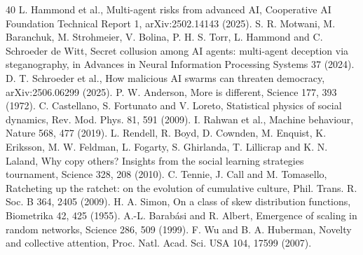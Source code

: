 \documentclass[twocolumn,10pt]{article}
\begin{document}
\begin{thebibliography}{40}
 L. Hammond et al., Multi-agent risks from advanced AI, Cooperative AI Foundation Technical Report 1, arXiv:2502.14143 (2025).
 S. R. Motwani, M. Baranchuk, M. Strohmeier, V. Bolina, P. H. S. Torr, L. Hammond and C. Schroeder de Witt, Secret collusion among AI agents: multi-agent deception via steganography, in Advances in Neural Information Processing Systems 37 (2024).
 D. T. Schroeder et al., How malicious AI swarms can threaten democracy, arXiv:2506.06299 (2025).
 P. W. Anderson, More is different, Science 177, 393 (1972).
 C. Castellano, S. Fortunato and V. Loreto, Statistical physics of social dynamics, Rev. Mod. Phys. 81, 591 (2009).
 I. Rahwan et al., Machine behaviour, Nature 568, 477 (2019).
 L. Rendell, R. Boyd, D. Cownden, M. Enquist, K. Eriksson, M. W. Feldman, L. Fogarty, S. Ghirlanda, T. Lillicrap and K. N. Laland, Why copy others? Insights from the social learning strategies tournament, Science 328, 208 (2010).
 C. Tennie, J. Call and M. Tomasello, Ratcheting up the ratchet: on the evolution of cumulative culture, Phil. Trans. R. Soc. B 364, 2405 (2009).
 H. A. Simon, On a class of skew distribution functions, Biometrika 42, 425 (1955).
 A.-L. Barab\'asi and R. Albert, Emergence of scaling in random networks, Science 286, 509 (1999).
 F. Wu and B. A. Huberman, Novelty and collective attention, Proc. Natl. Acad. Sci. USA 104, 17599 (2007).
\end{thebibliography}
\end{document}
